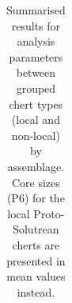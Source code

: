 \documentclass[
  a4paper,
  DIV=11,
  numbers=noendperiod]{scrreprt}
\begin{document}
\begin{longtable}[]{@{}
  >{\raggedright\arraybackslash}p{}
  >{\raggedright\arraybackslash}p{}
  >{\raggedright\arraybackslash}p{}
  >{\raggedright\arraybackslash}p{}
  >{\raggedright\arraybackslash}p{}
  >{\raggedright\arraybackslash}p{}
  >{\raggedright\arraybackslash}p{}@{}}

\caption{\label{tbl-results-sum}Summarised results for analysis
parameters between grouped chert types (local and non-local) by
assemblage. Core sizes (P6) for the local Proto-Solutrean cherts are
presented in mean values instead.}

\tabularnewline


\end{longtable}
\end{document}
